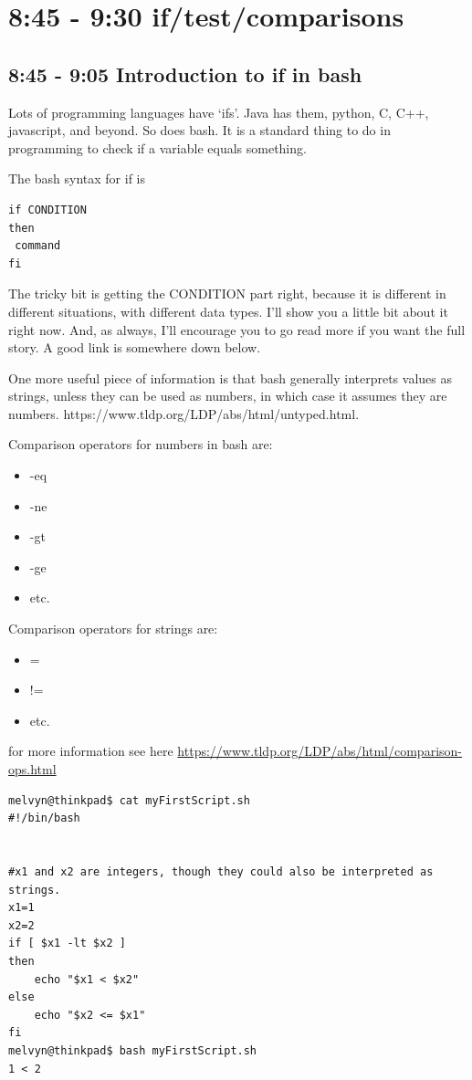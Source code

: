 \documentclass[10pt]{article}
\begin{document}
\section{ 8:45 - 9:30 if/test/comparisons}
\subsection{8:45 - 9:05 Introduction to if in bash}
Lots of programming languages have `ifs'. Java has them, python, C, C++,
javascript, and beyond. So does bash. It is a standard thing to do in
programming to check if a variable equals something.

The bash syntax for if is 

\begin{verbatim}
if CONDITION
then
 command
fi
\end{verbatim}

The tricky bit is getting the CONDITION part right, because it is different in
different situations, with different data types. I'll show you a little bit
about it right now. And, as always, I'll encourage you to go read more if you
want the full story. A good link is somewhere down below.

One more useful piece of information is that bash generally interprets values as strings, unless they can be used as numbers, in which case it assumes they are numbers. https://www.tldp.org/LDP/abs/html/untyped.html.

Comparison operators for numbers in bash are:

\begin{itemize}
\item -eq
\item -ne
\item -gt
\item -ge 
\item etc.
\end{itemize}

Comparison operators for strings are:

\begin{itemize}
\item =
\item !=
\item etc.
\end{itemize}

for more information see here
\url{https://www.tldp.org/LDP/abs/html/comparison-ops.html}


\begin{lstlisting}[style=term]
melvyn@thinkpad$ cat myFirstScript.sh
#!/bin/bash


#x1 and x2 are integers, though they could also be interpreted as strings.
x1=1
x2=2
if [ $x1 -lt $x2 ]        
then
    echo "$x1 < $x2"
else
    echo "$x2 <= $x1"
fi
melvyn@thinkpad$ bash myFirstScript.sh
1 < 2
\end{lstlisting}
\end{document}
